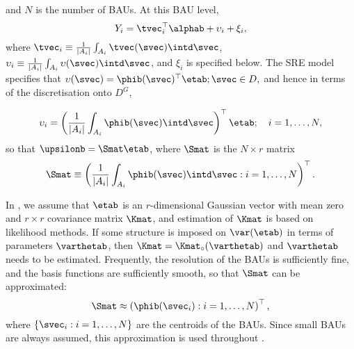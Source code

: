 \noindent and $N$ is the number of BAUs. At this BAU level,
\begin{equation} \label{eq:Yi1}
Y_i = \tvec_i^\top\alphab + \upsilon_i + \xi_i,
\end{equation}
\noindent where $\tvec_i \equiv \frac{1}{|A_i|}\int_{A_i} \tvec(\svec) \intd \svec$, $\upsilon_i\equiv \frac{1}{|A_i|}\int_{A_i} \upsilon(\svec) \intd \svec$, and $\xi_i$ is specified below. The SRE model specifies that $\upsilon(\svec) = \phib(\svec)^\top\etab; \svec \in D,$ and hence in terms of the discretisation onto $D^G$,


$$
\upsilon_i = \left(\frac{1}{|A_i|}\int_{A_i}\phib(\svec)\intd \svec\right)^\top \etab; \quad i = 1,\dots,N,
$$
\noindent so that $\upsilonb = \Smat\etab$, where $\Smat$ is the $N \times r$ matrix
\begin{equation*}%
\Smat \equiv \left(\frac{1}{|A_i|}\int_{A_i}\phib(\svec)\intd\svec : i = 1,\dots,N\right)^\top.
\end{equation*}

In , we assume that $\etab$ is an $r$-dimensional Gaussian vector with mean zero and $r \times r$ covariance matrix $\Kmat$, and estimation of $\Kmat$ is based on likelihood methods. If some structure is imposed on $\var(\etab)$ in terms of parameters $\varthetab$, then $\Kmat = \Kmat_\circ(\varthetab)$ and $\varthetab$ needs to be estimated. Frequently, the resolution of the BAUs is sufficiently fine, and the basis functions are sufficiently smooth, so that $\Smat$ can be approximated:
\begin{equation}\label{eq:Sapprox}
\Smat \approx \left(\phib(\svec_i) : i = 1,\dots,N\right)^\top,
\end{equation}
where $\{\svec_i: i = 1,\dots,N\}$ are the centroids of the BAUs. Since small BAUs are always assumed, this approximation is used throughout .

